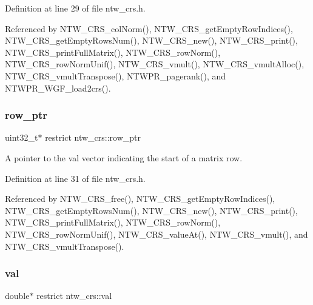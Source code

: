 Definition at line 29 of file ntw\+\_\+crs.\+h.



Referenced by N\+T\+W\+\_\+\+C\+R\+S\+\_\+col\+Norm(), N\+T\+W\+\_\+\+C\+R\+S\+\_\+get\+Empty\+Row\+Indices(), N\+T\+W\+\_\+\+C\+R\+S\+\_\+get\+Empty\+Rows\+Num(), N\+T\+W\+\_\+\+C\+R\+S\+\_\+new(), N\+T\+W\+\_\+\+C\+R\+S\+\_\+print(), N\+T\+W\+\_\+\+C\+R\+S\+\_\+print\+Full\+Matrix(), N\+T\+W\+\_\+\+C\+R\+S\+\_\+row\+Norm(), N\+T\+W\+\_\+\+C\+R\+S\+\_\+row\+Norm\+Unif(), N\+T\+W\+\_\+\+C\+R\+S\+\_\+vmult(), N\+T\+W\+\_\+\+C\+R\+S\+\_\+vmult\+Alloc(), N\+T\+W\+\_\+\+C\+R\+S\+\_\+vmult\+Transpose(), N\+T\+W\+P\+R\+\_\+pagerank(), and N\+T\+W\+P\+R\+\_\+\+W\+G\+F\+\_\+load2crs().

\mbox{\label{structntw__crs_abf117885ca226f2a82ff28dca7177c34}} 
\subsubsection{\texorpdfstring{row\+\_\+ptr}{row\_ptr}}
{\footnotesize\ttfamily uint32\+\_\+t$\ast$ restrict ntw\+\_\+crs\+::row\+\_\+ptr}

A pointer to the val vector indicating the start of a matrix\textquotesingle{} row. 

Definition at line 31 of file ntw\+\_\+crs.\+h.



Referenced by N\+T\+W\+\_\+\+C\+R\+S\+\_\+free(), N\+T\+W\+\_\+\+C\+R\+S\+\_\+get\+Empty\+Row\+Indices(), N\+T\+W\+\_\+\+C\+R\+S\+\_\+get\+Empty\+Rows\+Num(), N\+T\+W\+\_\+\+C\+R\+S\+\_\+new(), N\+T\+W\+\_\+\+C\+R\+S\+\_\+print(), N\+T\+W\+\_\+\+C\+R\+S\+\_\+print\+Full\+Matrix(), N\+T\+W\+\_\+\+C\+R\+S\+\_\+row\+Norm(), N\+T\+W\+\_\+\+C\+R\+S\+\_\+row\+Norm\+Unif(), N\+T\+W\+\_\+\+C\+R\+S\+\_\+value\+At(), N\+T\+W\+\_\+\+C\+R\+S\+\_\+vmult(), and N\+T\+W\+\_\+\+C\+R\+S\+\_\+vmult\+Transpose().

\mbox{\label{structntw__crs_a5ed2cc918a69051b395e9b151a66867f}} 
\subsubsection{\texorpdfstring{val}{val}}
{\footnotesize\ttfamily double$\ast$ restrict ntw\+\_\+crs\+::val}

